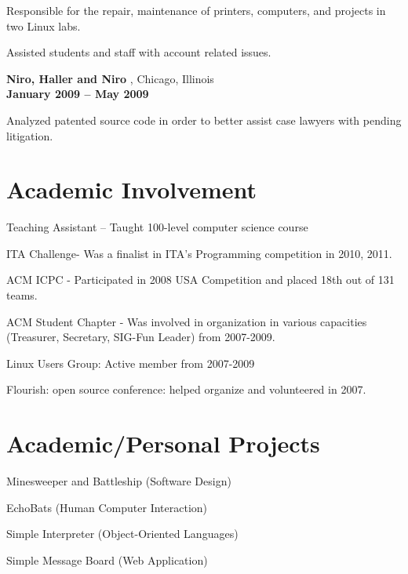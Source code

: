 \documentclass[margin,line]{resume}
\begin{document}
\begin{resume}
    \begin{list2}
        \item Responsible for the repair, maintenance of printers, computers, and projects in two Linux labs.
        \item Assisted students and staff with account related issues.
    \end{list2}



    {\bf Niro, Haller and Niro }, Chicago, Illinois\\
    \vspace{1mm}{\sl Junior Computer Consultant } \hfill {\bf January 2009 -- May 2009 }
    

    \begin{list2}
        \item Analyzed patented source code in order to better assist case lawyers with pending litigation.
    \end{list2}
	
    \section{\mysidestyle Academic Involvement} 

     \begin{list2}
        \item Teaching Assistant  -- Taught 100-level computer science course
        \item ITA Challenge- Was a finalist in ITA’s Programming competition in 2010, 2011.
        \item ACM ICPC - Participated in 2008 USA Competition and placed 18th out of 131 teams.
        \item ACM Student Chapter - Was involved in organization in various capacities (Treasurer, Secretary, SIG-Fun Leader) from 2007-2009.
        \item Linux Users Group: Active member from 2007-2009
        \item Flourish: open source conference:  helped organize and volunteered in 2007.
    \end{list2}


%
    \section{\mysidestyle Academic/Personal Projects } 
     \begin{list2}
        \item Minesweeper and Battleship (Software Design)
        \item EchoBats (Human Computer Interaction)
        \item Simple Interpreter (Object-Oriented Languages)
        \item Simple Message Board (Web Application)


\end{list2}
\end{resume}
\end{document}
